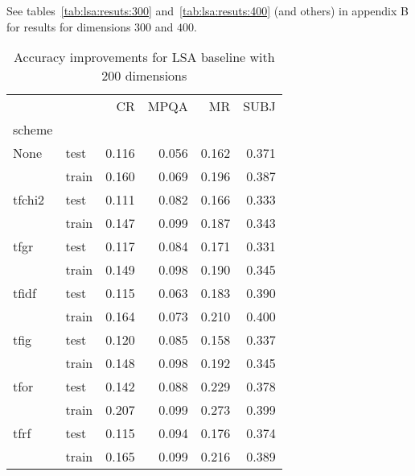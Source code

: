     See tables~\ref{tab:lsa:resuts:300} and~\ref{tab:lsa:resuts:400} (and others) in appendix B for results for dimensions $300$ and $400$.
    
\begin{table}[H]
\begin{center}

\begin{tabular}{llrrrr}
\toprule
{} &      &  CR &  MPQA &  MR &  SUBJ \\
scheme &  &            &              &            &              \\
\midrule
None & test &      0.116 &        0.056 &      0.162 &        0.371 \\
{} & train &      0.160 &        0.069 &      0.196 &        0.387 \\
tfchi2 & test &      0.111 &        0.082 &      0.166 &        0.333 \\
{} & train &      0.147 &        0.099 &      0.187 &        0.343 \\
tfgr & test &      0.117 &        0.084 &      0.171 &        0.331 \\
{} & train &      0.149 &        0.098 &      0.190 &        0.345 \\
tfidf & test &      0.115 &        0.063 &      0.183 &        0.390 \\
{} & train &      0.164 &        0.073 &      0.210 &        0.400 \\
tfig & test &      0.120 &        0.085 &      0.158 &        0.337 \\
{} & train &      0.148 &        0.098 &      0.192 &        0.345 \\
tfor & test &      0.142 &        0.088 &      0.229 &        0.378 \\
{} & train &      0.207 &        0.099 &      0.273 &        0.399 \\
tfrf & test &      0.115 &        0.094 &      0.176 &        0.374 \\
{} & train &      0.165 &        0.099 &      0.216 &        0.389 \\
\bottomrule
\end{tabular}

\caption[Accuracy improvements for LSA baseline with 200 dimensions]{Accuracy improvements for LSA baseline with 200 dimensions}
\label{tab:lsa:resuts:200:main}
\end{center}
\end{table}
    
